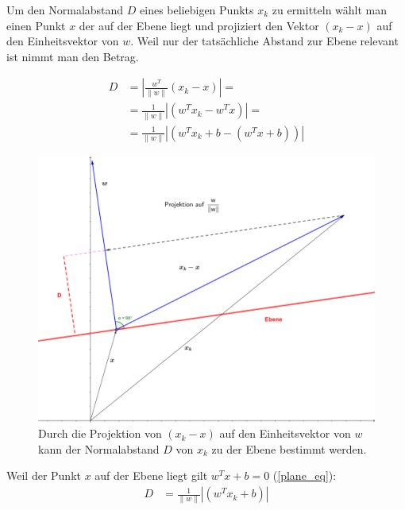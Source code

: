 \documentclass[a4paper,11pt,twoside]{scrreprt}
\newcommand{\norm}[1]{\lVert#1\rVert}
\begin{document}
Um den Normalabstand $D$ eines beliebigen Punkts $x_{k}$ zu ermitteln wählt man einen Punkt $x$ der auf der Ebene liegt und projiziert den Vektor $(x_{k} - x)$ auf den Einheitsvektor von $w$. Weil nur der tatsächliche Abstand zur Ebene relevant ist nimmt man den Betrag.

\begin{equation} \label{distance_to_plane}
	\begin{aligned}
		D &= | \frac{w^{T}}{\lVert w \rVert} (x_{k} - x) | = \\
		&= \frac{1}{\norm{w}} | (w^{T} x_{k} - w^{T} x) | =\\
		&= \frac{1}{\norm{w}} | (w^{T} x_{k} + b - (w^{T} x + b)) |
	\end{aligned}
\end{equation}

\begin{figure}[H]
	\centering
	\includegraphics{assets/projection.png}
	\caption{Durch die Projektion von $(x_{k} - x)$ auf den Einheitsvektor von $w$ kann der Normalabstand $D$ von $x_{k}$ zu der Ebene bestimmt werden.}
	\label{fig:projection}
\end{figure}

Weil der Punkt $x$ auf der Ebene liegt gilt $w^{T} x + b = 0$ (\autoref{plane_eq}):
\begin{equation} \label{distance_to_plane_simplified1}
	\begin{aligned}
		D &= \frac{1}{\norm{w}} | (w^{T} x_{k} + b) |
	\end{aligned}
\end{equation}
\end{document}

